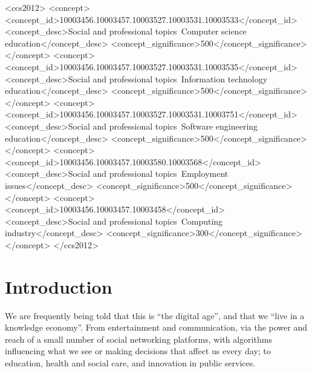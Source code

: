 \documentclass[sigconf]{acmart}
\begin{document}
\begin{CCSXML}
<ccs2012>
<concept>
<concept_id>10003456.10003457.10003527.10003531.10003533</concept_id>
<concept_desc>Social and professional topics~Computer science education</concept_desc>
<concept_significance>500</concept_significance>
</concept>
<concept>
<concept_id>10003456.10003457.10003527.10003531.10003535</concept_id>
<concept_desc>Social and professional topics~Information technology education</concept_desc>
<concept_significance>500</concept_significance>
</concept>
<concept>
<concept_id>10003456.10003457.10003527.10003531.10003751</concept_id>
<concept_desc>Social and professional topics~Software engineering education</concept_desc>
<concept_significance>500</concept_significance>
</concept>
<concept>
<concept_id>10003456.10003457.10003580.10003568</concept_id>
<concept_desc>Social and professional topics~Employment issues</concept_desc>
<concept_significance>500</concept_significance>
</concept>
<concept>
<concept_id>10003456.10003457.10003458</concept_id>
<concept_desc>Social and professional topics~Computing industry</concept_desc>
<concept_significance>300</concept_significance>
</concept>
</ccs2012>
\end{CCSXML}



\maketitle


\section{Introduction}


We are frequently being told that this is ``the digital age'', and
that we ``live in a knowledge economy''. %
From entertainment and communication, via the power
and reach of a small number of social networking platforms, with algorithms
influencing what we see or making decisions that affect us every day;
to education, health and social care, and innovation in public
services.%
\end{document}
